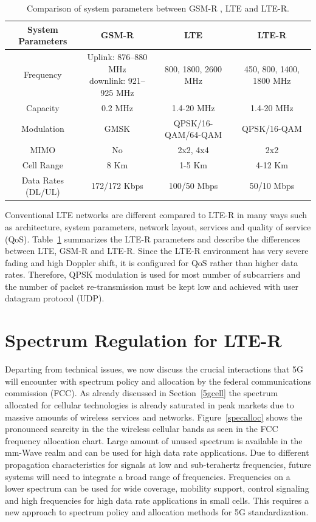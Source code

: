 \begin{table}[h!]
\caption{Comparison of system parameters between GSM-R , LTE and LTE-R.}
\begin{adjustbox}{width=1.22\textwidth, center=\textwidth}
\begin{tabular}{c | c | c | c}
\toprule
System Parameters & GSM-R & LTE & LTE-R\\ 
\midrule
Frequency & \shortstack{Uplink: 876--880 MHz\\downlink: 921--925 MHz} & 800, 1800, 2600 MHz & 450, 800, 1400, 1800 MHz \\  
Capacity  & 0.2 MHz & 1.4-20 MHz & 1.4-20 MHz\\ 
Modulation  & GMSK & QPSK/16-QAM/64-QAM & QPSK/16-QAM\\ 
MIMO  & No  & 2x2, 4x4  & 2x2\\ 
Cell Range  & 8 Km  & 1-5 Km & 4-12 Km \\ 
Data Rates (DL/UL)  & 172/172 Kbps  & 100/50 Mbps & 50/10 Mbps\\ 
\bottomrule
\end{tabular}
\end{adjustbox}
\label{ltertable}
\end{table}

Conventional LTE networks are different compared to LTE-R in many ways such as architecture, system parameters, network layout, services and quality of service (QoS). Table~\ref{ltertable} summarizes the LTE-R parameters and describe the differences between LTE, GSM-R and LTE-R. Since the LTE-R environment has very severe fading and high Doppler shift, it is configured for QoS rather than higher data rates. Therefore, QPSK modulation is used for most number of subcarriers and the number of packet re-transmission must be kept low and achieved with user datagram protocol (UDP).


\section{Spectrum Regulation for LTE-R}

Departing from technical issues, we now discuss the crucial interactions that 5G will encounter with spectrum policy and allocation by the federal communications commission (FCC). As already discussed in Section~\ref{5gcell} the spectrum allocated for cellular technologies is already saturated in peak markets due to massive amounts of wireless services and networks. Figure~\ref{specalloc} shows the pronounced scarcity in the the wireless cellular bands as seen in the FCC frequency allocation chart. Large amount of unused spectrum is available in the mm-Wave realm and can be used for high data rate applications. Due to different propagation characteristics for signals at low and sub-terahertz frequencies, future systems will need to integrate a broad range of frequencies. Frequencies on a lower spectrum can be used for wide coverage, mobility support, control signaling and high frequencies for high data rate applications in small cells. This requires a new approach to spectrum policy and allocation methods for 5G standardization.

